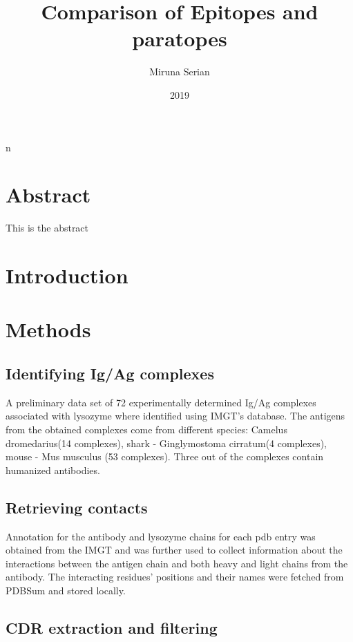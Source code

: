 \documentclass{article}
\begin{document}
n
\title{Comparison of Epitopes and paratopes}

\author{Miruna Serian}
\date{2019}
\maketitle
\newpage 

\section*{Abstract}
\markright{}
This is the abstract
\section{Introduction}
\markright{}
\newpage 
\section{Methods}
\subsection{Identifying Ig/Ag complexes}
A preliminary data set of 72 experimentally determined Ig/Ag complexes associated with lysozyme where identified using IMGT's database. The antigens from the obtained complexes come from different species: Camelus dromedarius(14 complexes), shark - Ginglymostoma cirratum(4 complexes), mouse - Mus musculus (53 complexes). Three out of the complexes contain humanized antibodies.
 
\subsection{Retrieving contacts}
Annotation for the antibody and lysozyme chains for each pdb entry was obtained from the IMGT and was further used to collect information about the interactions between the antigen chain and both heavy and light chains from the antibody. The interacting residues' positions and their names were fetched from PDBSum and stored locally.

\subsection{CDR extraction and filtering}
\end{document}
